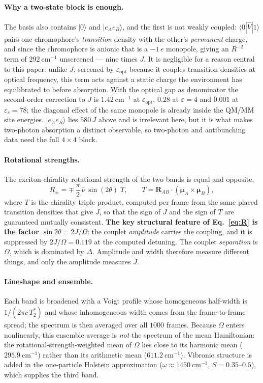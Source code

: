 \documentclass[11pt,a4paper]{article}
\begin{document}
\paragraph{Why a two-state block is enough.} The basis also contains
$|0\rangle$ and $|e_Ae_B\rangle$, and the first is not weakly coupled:
$\langle 0|\hat V|1\rangle$ pairs one chromophore's \emph{transition} density
with the other's \emph{permanent} charge, and since the chromophore is anionic
that is a $-1\,e$ monopole, giving an $R^{-2}$ term of $292~\mathrm{cm^{-1}}$
unscreened --- nine times $J$. It is negligible for a reason central to this
paper: unlike $J$, screened by $\varepsilon_{\mathrm{opt}}$ because it couples
transition densities at optical frequency, this term acts against a static
charge the environment has equilibrated to before absorption. With the optical
gap as denominator the second-order correction to $J$ is $1.42~\mathrm{cm^{-1}}$
at $\varepsilon_{\mathrm{opt}}$, $0.28$ at $\varepsilon=4$ and $0.001$ at
$\varepsilon_s=78$; the diagonal effect of the same monopole is already inside
the QM/MM site energies. $|e_Ae_B\rangle$ lies $580\,J$ above and is irrelevant
here, but it is what makes two-photon absorption a distinct observable, so
two-photon and antibunching data need the full $4\times4$ block.

\paragraph{Rotational strengths.} The exciton-chirality rotational strength of
the two bands is equal and opposite,
\begin{equation}
R_{\pm} = \mp\,\frac{\pi}{2}\,\bar\nu\,\sin(2\theta)\; T,
\qquad
T = \bm{R}_{AB}\cdot(\bm{\mu}_A \times \bm{\mu}_B),
\label{eq:R}
\end{equation}
where $T$ is the chirality triple product, computed per frame from the same
placed transition densities that give $J$, so that the sign of $J$ and the sign
of $T$ are guaranteed mutually consistent. \textbf{The key structural feature of
Eq.~\eqref{eq:R} is the factor $\sin 2\theta = 2J/\Omega$}: the couplet
\emph{amplitude} carries the coupling, and it is suppressed by $2J/\Omega =
0.119$ at the computed detuning. The couplet \emph{separation} is $\Omega$,
which is dominated by $\Delta$. Amplitude and width therefore measure different
things, and only the amplitude measures $J$.

\paragraph{Lineshape and ensemble.} Each band is broadened with a Voigt profile
whose homogeneous half-width is $1/(2\pi c\,T_2^{*})$ and whose inhomogeneous
width comes from the frame-to-frame spread; the spectrum is then averaged over
all $1000$ frames. Because $\Omega$ enters nonlinearly, this ensemble average is
\emph{not} the spectrum of the mean Hamiltonian: the rotational-strength-weighted
mean of $\Omega$ lies close to its harmonic mean ($295.9~\mathrm{cm^{-1}}$)
rather than its arithmetic mean ($611.2~\mathrm{cm^{-1}}$). Vibronic structure is
added in the one-particle Holstein approximation ($\omega \approx
1450~\mathrm{cm^{-1}}$, $S = 0.35$--$0.5$), which supplies the third band.
\end{document}
